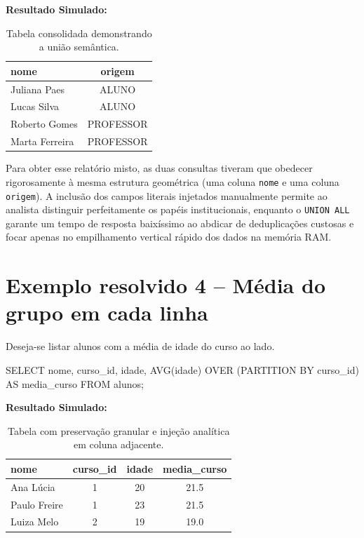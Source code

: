 \textbf{Resultado Simulado:}

\begin{table}[H]
    \centering
    \begin{tabular}{|l|c|}
    \hline
    \textbf{nome} & \textbf{origem} \\
    \hline
    Juliana Paes & ALUNO \\
    Lucas Silva & ALUNO \\
    Roberto Gomes & PROFESSOR \\
    Marta Ferreira & PROFESSOR \\
    \hline
    \end{tabular}
    \caption{Tabela consolidada demonstrando a união semântica.}
\end{table}

Para obter esse relatório misto, as duas consultas tiveram que obedecer rigorosamente à mesma estrutura geométrica (uma coluna \texttt{nome} e uma coluna \texttt{origem}). A inclusão dos campos literais injetados manualmente permite ao analista distinguir perfeitamente os papéis institucionais, enquanto o \texttt{UNION ALL} garante um tempo de resposta baixíssimo ao abdicar de deduplicações custosas e focar apenas no empilhamento vertical rápido dos dados na memória RAM.

\section{Exemplo resolvido 4 -- Média do grupo em cada linha}

Deseja-se listar alunos com a média de idade do curso ao lado.

\begin{sqlcode}
SELECT
    nome,
    curso_id,
    idade,
    AVG(idade) OVER (PARTITION BY curso_id) AS media_curso
FROM alunos;
\end{sqlcode}

\textbf{Resultado Simulado:}

\begin{table}[H]
    \centering
    \begin{tabular}{|l|c|c|c|}
    \hline
    \textbf{nome} & \textbf{curso\_id} & \textbf{idade} & \textbf{media\_curso} \\
    \hline
    Ana Lúcia & 1 & 20 & 21.5 \\
    Paulo Freire & 1 & 23 & 21.5 \\
    Luiza Melo & 2 & 19 & 19.0 \\
    \hline
    \end{tabular}
    \caption{Tabela com preservação granular e injeção analítica em coluna adjacente.}
\end{table}

